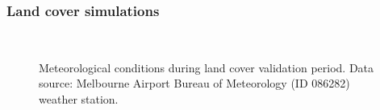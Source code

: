 \documentclass[final,3p,times,authoryear]{elsarticle}
\newcommand{\degreeC}{\ensuremath{^\circ}C }
\begin{document}
\subsubsection{Land cover simulations}\label{sec:landcoversim} 


\begin{figure}[!htbp]
~
 \caption{Meteorological conditions during land cover validation period. Data source: Melbourne Airport Bureau of Meteorology (ID 086282) weather station.} \label{fig:met}
\end{figure}

%
\end{document}
